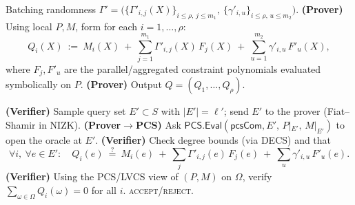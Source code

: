 \begin{algorithm}[H]
\caption{\textsf{PACS.PIOPBatchCombine}\(_\text{Prover}(\textsf{pcsCom},\Gamma')\to Q\)}
\begin{algorithmic}[1]
\Require Batching randomness \(\Gamma'=\big(\{\Gamma'_{i,j}(X)\}_{i\le \rho,\,j\le m_1},\ \{\gamma'_{i,u}\}_{i\le \rho,\,u\le m_2}\big)\).
\State \textbf{(Prover)} Using local \(P,M\), form for each \(i=1,\dots,\rho\):
\[
Q_i(X)\ :=\ M_i(X)\ +\ \sum_{j=1}^{m_1}\Gamma'_{i,j}(X)\,F_j(X)\ +\ \sum_{u=1}^{m_2}\gamma'_{i,u}\,F'_u(X),
\]
where \(F_j,F'_u\) are the parallel/aggregated constraint polynomials evaluated symbolically on \(P\). 
\State \textbf{(Prover)} Output \(Q=(Q_1,\ldots,Q_\rho)\).
\end{algorithmic}
\end{algorithm}

\begin{algorithm}[H]
\caption{\textsf{PACS.PIOPOpenAndCheck}\((\textsf{pcsCom},Q)\to \{\textsc{accept},\textsc{reject}\}\)}
\begin{algorithmic}[1]
\State \textbf{(Verifier)} Sample query set \(E'\subset S\) with \(|E'|=\ell'\); send \(E'\) to the prover (Fiat--Shamir in NIZK).
\State \textbf{(Prover\(\rightarrow\)PCS)} Ask \(\textsf{PCS.Eval}(\textsf{pcsCom},E',\,P|_{E'},\,M|_{E'})\) to open the oracle at \(E'\).
\State \textbf{(Verifier)} Check degree bounds (via DECS) and that
\[
\forall i,\ \forall e\in E':\quad Q_i(e)\ \stackrel{?}{=}\ M_i(e)\ +\ \sum_j \Gamma'_{i,j}(e)\,F_j(e)\ +\ \sum_u \gamma'_{i,u}\,F'_u(e).
\]
\State \textbf{(Verifier)} Using the PCS/LVCS view of \((P,M)\) on \(\Omega\), verify \(\sum_{\omega\in\Omega} Q_i(\omega)=0\) for all \(i\). 
\State \Return \textsc{accept}/\textsc{reject}.
\end{algorithmic}
\end{algorithm}

